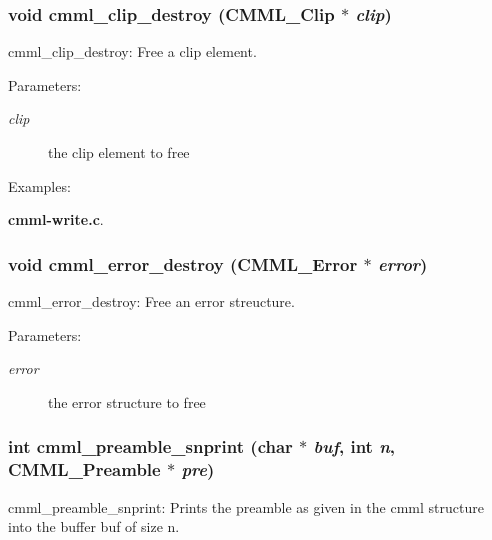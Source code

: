 \subsubsection{\setlength{\rightskip}{0pt plus 5cm}void cmml\_\-clip\_\-destroy ({\bf CMML\_\-Clip} $\ast$ {\em clip})}\label{cmml_8h_a71}


cmml\_\-clip\_\-destroy: Free a clip element.

\begin{Desc}
\item[Parameters:]
\begin{description}
\item[{\em clip}]the clip element to free \end{description}
\end{Desc}
\begin{Desc}
\item[Examples: ]\par
{\bf cmml-write.c}.\end{Desc}
\subsubsection{\setlength{\rightskip}{0pt plus 5cm}void cmml\_\-error\_\-destroy ({\bf CMML\_\-Error} $\ast$ {\em error})}\label{cmml_8h_a72}


cmml\_\-error\_\-destroy: Free an error streucture.

\begin{Desc}
\item[Parameters:]
\begin{description}
\item[{\em error}]the error structure to free \end{description}
\end{Desc}
\subsubsection{\setlength{\rightskip}{0pt plus 5cm}int cmml\_\-preamble\_\-snprint (char $\ast$ {\em buf}, int {\em n}, {\bf CMML\_\-Preamble} $\ast$ {\em pre})}\label{cmml_8h_a73}


cmml\_\-preamble\_\-snprint: Prints the preamble as given in the cmml structure into the buffer buf of size n.

